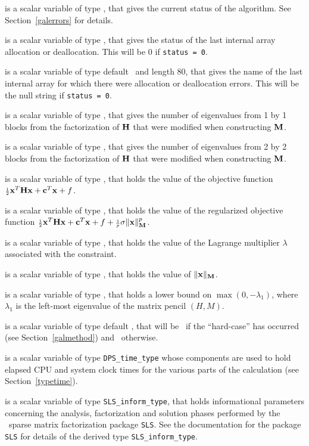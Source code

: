 \documentclass{galahad}
\newcommand{\packagename}{DPS}
\begin{document}
\begin{description}
 is a scalar variable of type \integer, that gives the
current status of the algorithm. See Section~\ref{galerrors} for details.

 is a scalar variable of type \integer,
that gives the status of the last internal array allocation
or deallocation. This will be 0 if {\tt status = 0}.

 is a scalar variable of type default \character\
and length 80, that  gives the name of the last internal array
for which there were allocation or deallocation errors.
This will be the null string if {\tt status = 0}.

 is a scalar variable of type \integer,
that gives the number of eigenvalues from 1 by 1 blocks from the
factorization of ${\mathbf{H}}$ that were modified when constructing ${\mathbf{M}}$.

 is a scalar variable of type \integer,
that gives the number of eigenvalues from 2 by 2 blocks from the
factorization of ${\mathbf{H}}$ that were modified when constructing ${\mathbf{M}}$.

 is a scalar variable of type \realdp, that holds the
value of the objective function ${\scriptstyle \frac{1}{2}} {\mathbf{x}}^T {\mathbf{H}} {\mathbf{x}}  +  {\mathbf{c}}^T {\mathbf{x}} + f$.

 is a scalar variable of type \realdp, that
holds the value of the regularized objective function ${\scriptstyle \frac{1}{2}} {\mathbf{x}}^T {\mathbf{H}} {\mathbf{x}}
 + {\mathbf{c}}^T {\mathbf{x}} + f + {\scriptstyle \frac{1}{p}} \sigma \|{\mathbf{x}}\|_{{\mathbf{M}}}^p$.

 is a scalar variable of type \realdp, that holds the
value of the Lagrange multiplier $\lambda$ associated with the constraint.

 is a scalar variable of type \realdp,
that holds the value of $\|{\mathbf{x}}\|_{{\mathbf{M}}}$.

 is a scalar variable of type \realdp, that holds a lower
bound on $\max(0,-\lambda_1)$, where $\lambda_1$ is the left-most eigenvalue of
the matrix pencil $(H,M)$.

 is a scalar variable of type default \logical, that will be
\true\ if the ``hard-case'' has occurred (see Section~\ref{galmethod})
and \false\ otherwise.

 is a scalar variable of type {\tt \packagename\_time\_type}
whose components are used to hold elapsed CPU  and system clock times for the
various parts of the calculation (see Section~\ref{typetime}).

 is a scalar variable of type {\tt SLS\_inform\_type},
that holds informational parameters concerning the analysis, factorization
and solution phases performed by
the \galahad\ sparse matrix factorization package {\tt SLS}.
See the documentation for the package {\tt SLS} for details of the
derived type {\tt SLS\_inform\_type}.

\end{description}
\end{document}
